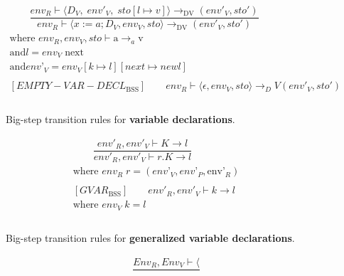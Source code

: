 \begin{figure}[htbp]
	\centering
	\begin{gather*}
		[VAR-DECL_\text{BSS}]
		\qquad 
		\dfrac
		{env_R \vdash \langle D_V,\; env'_V, \; sto[l \mapsto v] \rangle \rightarrow_\text{DV} (env'_V, sto')}
		{env_R \vdash \langle x:=a; D_V, env_V, sto \rangle \rightarrow_\text{DV} (env'_V, sto')} \\
		\text{where } \textit{env}_R, \textit{env}_V, \textit{sto} \vdash \text{a} \rightarrow_a \text{v} \\
		\text{and} \textit{l} = \textit{env}_V \; \text{next} \\
		\text{and} \textit{env'}_V = \textit{env}_V[k \mapsto l][next \mapsto new l]
		\\
		\\
		[EMPTY-VAR-DECL_\text{BSS}]
		\qquad env_R \vdash \langle \epsilon, env_V, sto \rangle \rightarrow_DV (env'_V, sto')
		\\
		\\
	\end{gather*}
	\caption{Big-step transition rules for \textbf{variable declarations}.}
	\label{fig:BssStm}
\end{figure}

\begin{figure}[htbp]
	\centering
	\begin{gather*}
		[GVAR_\text{BSS}]
		\qquad 
		\dfrac
		{env'_R, env'_V \vdash K \rightarrow \textit{l}}
		{env'_R, env'_V \vdash r.K \rightarrow \textit{l}} \\
		\text{where } \textit{env}_R \; r = (\textit{env'}_V, \textit{env'}_P, \text{env'}_R)
		\\
		\\
		[GVAR_\text{BSS}]
		\qquad env'_R, env'_V \vdash k \rightarrow l \\
		\text{where } \textit{env}_V \; k = l
		\\
		\\
	\end{gather*}
	\caption{Big-step transition rules for \textbf{generalized variable declarations}.}
	\label{fig:BssStm}
\end{figure}

\begin{figure}[htbp]
	\centering
	\begin{gather*}
		[MEMBERACCESS_\text{BSS}]
		\qquad
		\dfrac{Env_R, Env_V \vdash \langle  }{}	
	\end{gather*}
	\caption{}
	\label{fig:BssStm}
\end{figure}

